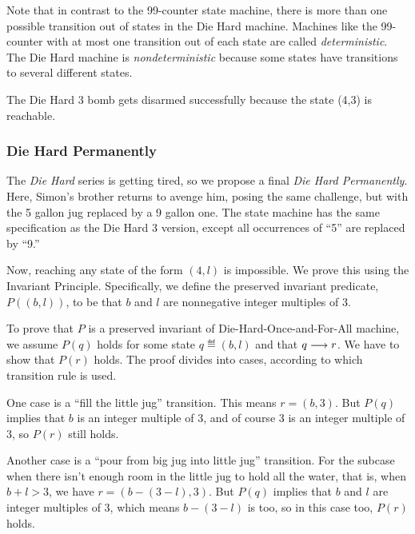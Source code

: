 Note that in contrast to the 99-counter state machine, there is more than
one possible transition out of states in the Die Hard machine.  Machines
like the 99-counter with at most one transition out of each state are
called \emph{deterministic}.  The Die Hard machine is
\emph{nondeterministic} because some states have transitions to several
different states.

The Die Hard 3 bomb gets disarmed successfully because the state (4,3)
is reachable.



\subsubsection{Die Hard Permanently}
The \emph{Die Hard} series is getting tired, so we propose a final
\emph{Die Hard Permanently}.  Here, Simon's brother returns to
avenge him, posing the same challenge, but with the 5 gallon jug
replaced by a 9 gallon one.  The state machine has the same
specification as the Die Hard 3 version, except all occurrences of
``5'' are replaced by ``9.''

Now, reaching any state of the form $(4,l)$ is impossible.  We prove
this using the Invariant Principle.  Specifically, we define the
preserved invariant predicate, $P((b,l))$, to be that $b$ and $l$ are
nonnegative integer multiples of 3.

To prove that $P$ is a preserved invariant of Die-Hard-Once-and-For-All
machine, we assume $P(q)$ holds for some state $q \eqdef (b,l)$ and that
$q \mathrel{\longrightarrow} r$.  We have to show that $P(r)$ holds.  The proof divides
into cases, according to which transition rule is used.

One case is a ``fill the little jug'' transition.  This means $r =
(b,3)$.  But $P(q)$ implies that $b$ is an integer multiple of 3, and
of course 3 is an integer multiple of 3, so $P(r)$ still holds.

Another case is a ``pour from big jug into little jug'' transition.
For the subcase when there isn't enough room in the little jug to hold
all the water, that is, when $b + l > 3$, we have $r = (b -( 3 -l), 3)$.
But $P(q)$ implies that $b$ and $l$ are integer multiples of 3, which
means $b -( 3 -l)$ is too, so in this case too, $P(r)$ holds.

